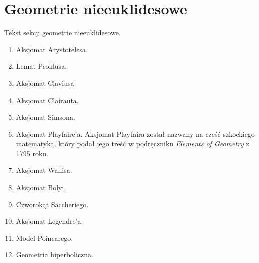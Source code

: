%

\section{Geometrie nieeuklidesowe}
Tekst sekcji geometrie nieeuklidesowe.
\begin{enumerate}
	\item Aksjomat Arystotelesa.
	\item Lemat Proklusa.
	\item Aksjomat Claviusa.
	\item Aksjomat Clairauta.
	\item Aksjomat Simsona.
	\item Aksjomat Playfaire'a.
	Aksjomat Playfaira został nazwany na cześć szkockiego matematyka, który podał jego treść w podręczniku \emph{Elements of Geometry} z 1795 roku.
%
%
	\item Aksjomat Wallisa.
	\item Aksjomat Bolyi.
	\item Czworokąt Saccheriego.
	\item Aksjomat Legendre'a.
	\item Model Poincarego.
	\item Geometria hiperboliczna.
\end{enumerate}

%